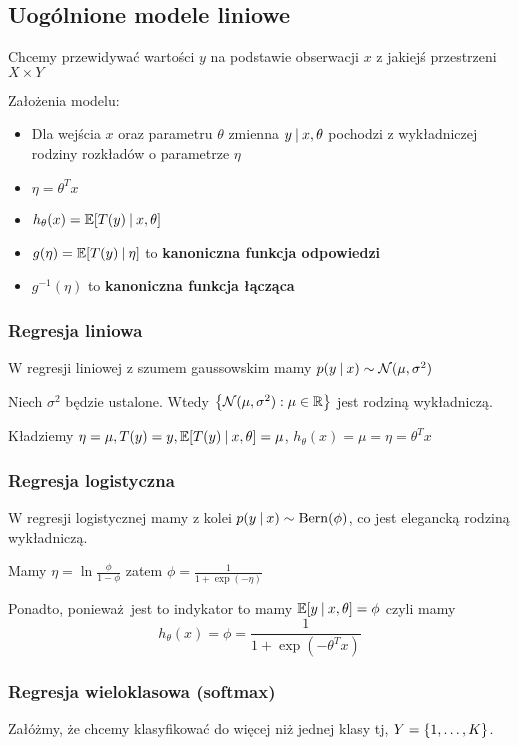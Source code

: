 \subsection{Uogólnione modele liniowe}

Chcemy przewidywać wartości \( y \) na podstawie obserwacji \( x \) z jakiejś przestrzeni \( X \times Y \)

Założenia modelu:
\begin{itemize}
    \item Dla wejścia \( x \) oraz parametru \( \theta \) zmienna \( y \:\vert\: x, \theta \) pochodzi z wykładniczej rodziny rozkładów o parametrze \( \eta \)
    \item \( \eta = \theta^T x \)
    \item \( h_\theta(x) = \expected{T(y) \given x, \theta} \)
    \item \( g(\eta) = \expected{T(y) \given \eta} \) to \textbf{kanoniczna funkcja odpowiedzi}
    \item \( g^{-1}(\eta) \) to \textbf{kanoniczna funkcja łącząca}
\end{itemize}

\subsubsection{Regresja liniowa}

W regresji liniowej z szumem gaussowskim mamy \( p(y \:\vert\: x) \sim \operatorname{\mathcal{N}}(\mu, \sigma^2) \)

Niech \( \sigma^2 \) będzie ustalone.
Wtedy \( \set{\Normal(\mu, \sigma^2) : \mu \in \real } \) jest rodziną wykładniczą.

Kładziemy \( \eta = \mu, T(y) = y, \expected{T(y) \given x, \theta} = \mu \), \( h_\theta(x) = \mu = \eta = \theta^T x \)

\subsubsection{Regresja logistyczna}

W regresji logistycznej mamy z kolei \( p(y \:\vert\: x) \sim \operatorname{Bern}(\phi) \), co jest elegancką rodziną wykładniczą.

Mamy \( \eta = \ln \frac{\phi}{1 - \phi} \) zatem \( \phi = \frac{1}{1 + \exp(-\eta)} \)

Ponadto, ponieważ jest to indykator to mamy \( \expected{y \given x, \theta} = \phi \)
czyli mamy
\[
    h_\theta(x) = \phi = \frac{1}{1 + \exp(-\theta^T x)}
\]


\subsubsection{Regresja wieloklasowa (softmax)}
Załóżmy, że chcemy klasyfikować do więcej niż jednej klasy tj, \( Y = \set{1, \dots, K} \).

